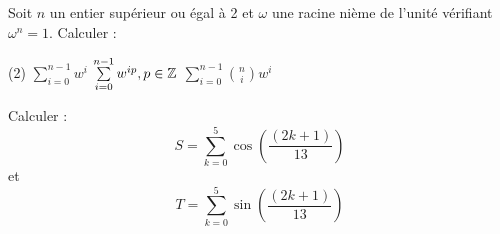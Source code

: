 \begin{exercise}[subtitle=Sommes et racines nièmes, difficulty=*]
	Soit $n$ un entier supérieur ou égal à 2 et $\omega$ une racine nième de l'unité vérifiant $\omega^n=1$. Calculer :
	\begin{tasks}(2)
		\task  $\sum\limits_{i=0}^{n-1} w^i$
		\task $\sum\limits_{i=0}^{n-1} w^{ip}, p\in \mathbb{Z}$
		\task $\sum\limits_{i=0}^{n-1} \binom{n}{i} w^{i}$
		\end{tasks}
\end{exercise}

\begin{exercise}[subtitle=Somme de cosinus, difficulty=*]
	Calculer :
	$$S = \sum\limits_{k=0}^{5} \cos(\frac{(2k+1)}{13})$$
	et 
	$$T = \sum\limits_{k=0}^{5} \sin(\frac{(2k+1)}{13})$$
\end{exercise}

